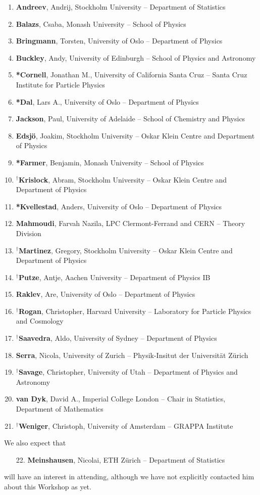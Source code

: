 \documentclass[a4paper,11pt]{article}
\begin{document}
\begin{enumerate} \itemsep -0.8mm
\item \textbf{Andreev}, Andrij, Stockholm University -- Department of Statistics
\item \textbf{Balazs}, Csaba, Monash University -- School of Physics
\item \textbf{Bringmann}, Torsten, University of Oslo -- Department of Physics 
\item \textbf{Buckley}, Andy, University of Edinburgh -- School of Physics and Astronomy
\item \textbf{*Cornell}, Jonathan M., University of California Santa Cruz -- Santa Cruz Institute for Particle Physics
\item \textbf{*Dal}, Lars A., University of Oslo -- Department of Physics
\item \textbf{Jackson}, Paul, University of Adelaide -- School of Chemistry and Physics
\item \textbf{Edsj\"o}, Joakim, Stockholm University -- Oskar Klein Centre and Department of Physics
\item \textbf{*Farmer}, Benjamin, Monash University -- School of Physics
\item \textbf{$^\dagger$Krislock}, Abram, Stockholm University -- Oskar Klein Centre and Department of Physics
\item \textbf{*Kvellestad}, Anders, University of Oslo -- Department of Physics 
\item \textbf{Mahmoudi}, Farvah Nazila, LPC Clermont-Ferrand and CERN -- Theory Division
\item \textbf{$^\dagger$Martinez}, Gregory, Stockholm University -- Oskar Klein Centre and Department of Physics
\item \textbf{$^\dagger$Putze}, Antje, Aachen University -- Department of Physics IB
\item \textbf{Raklev}, Are, University of Oslo -- Department of Physics 
\item \textbf{$^\dagger$Rogan}, Christopher, Harvard University -- Laboratory for Particle Physics and Cosmology
\item \textbf{$^\dagger$Saavedra}, Aldo, University of Sydney -- Department of Physics 
\item \textbf{Serra}, Nicola, University of Zurich -- Physik-Insitut der Universit\"at Z\"urich
\item \textbf{$^\dagger$Savage}, Christopher,  University of Utah -- Department of Physics and Astronomy
\item \textbf{van Dyk}, David A., Imperial College London -- Chair in Statistics, Department of Mathematics
\item \textbf{$^\dagger$Weniger}, Christoph, University of Amsterdam -- GRAPPA Institute
\end{enumerate}

\noindent We also expect that
\begin{enumerate}
\item[22.] \textbf{Meinshausen}, Nicolai, ETH Z\"urich -- Department of Statistics
\end{enumerate}
will have an interest in attending, although we have not explicitly contacted him about this Workshop as yet.
\end{document}
